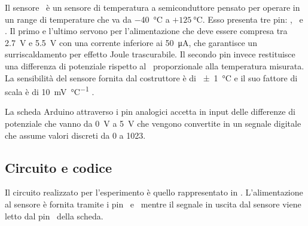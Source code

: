             Il sensore \tmp\ è un sensore di temperatura a semiconduttore pensato per operare in un range di temperature che va da \SI{-40}{\celsius} a $+\SI{125}{\celsius}$. Esso presenta tre pin: \vs, \vout\ e \gnd. Il primo e l'ultimo servono per l'alimentazione che deve essere compresa tra \SI{2.7}{\volt} e \SI{5.5}{\volt} con una corrente inferiore ai \SI{50}{\micro\ampere}, che garantisce un surriscaldamento per effetto Joule trascurabile. Il secondo pin invece restituisce una differenza di potenziale rispetto al \gnd\ proporzionale alla temperatura misurata. La sensibilità del sensore fornita dal costruttore è di \SI{\pm 1}{\celsius} e il suo fattore di scala è di \SI{10}{\milli\volt\per\celsius}  \cite{tmp36-datasheet}.

            La scheda Arduino attraverso i pin analogici accetta in input delle differenze di potenziale che vanno da \SI{0}{V} a \SI{5}{V} che vengono convertite in un segnale digitale che assume valori discreti da \num{0} a \num{1023}.

        \subsection{Circuito e codice}\label{ard:codice}
            Il circuito realizzato per l'esperimento è quello rappresentato in . L'alimentazione al sensore è fornita tramite i pin \pinV\ e \gnd\ mentre il segnale in uscita dal sensore viene letto dal pin \sensorpin\ della scheda.

